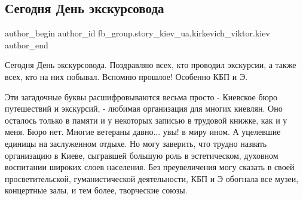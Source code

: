  
 
 
 
 
 
\subsection{Сегодня День экскурсовода}
\label{sec:21_02_2022.fb.fb_group.story_kiev_ua.1.den_ekskursovoda}
 
\ifcmt
 author_begin
   author_id fb_group.story_kiev_ua,kirkevich_viktor.kiev
 author_end
\fi

Сегодня День экскурсовода. Поздравляю всех, кто проводил экскурсии, а также
всех, кто на них побывал. Вспомню прошлое! Особенно КБП и Э.

Эти загадочные буквы расшифровываются весьма просто - Киевское бюро путешествий
и экскурсий, - любимая организация для многих киевлян. Оно осталось только в
памяти и у некоторых записью в трудовой книжке, как и у меня. Бюро нет. Многие
ветераны давно... увы! в миру ином. А уцелевшие единицы на заслуженном отдыхе. Но
могу заверить, что трудно назвать организацию в Киеве, сыгравшей большую роль в
эстетическом, духовном воспитании широких слоев населения. Без преувеличения
могу сказать в своей просветительской, гуманистической деятельности, КБП и Э
обогнала все музеи, концертные залы, и тем более, творческие союзы.

\raggedcolumns
\begin{multicols}{2} %
\setlength{\parindent}{0pt}




\end{multicols} %

